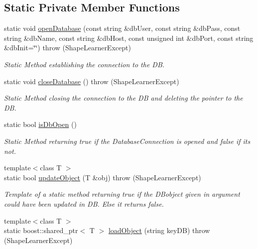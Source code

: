 \subsection*{Static Private Member Functions}
\begin{DoxyCompactItemize}
\item 
static void \hyperlink{class_database_manager_1_1_interface_a22da4aa92f1e0488a977f019e7829caf}{open\+Database} (const string \&db\+User, const string \&db\+Pass, const string \&db\+Name, const string \&db\+Host, const unsigned int \&db\+Port, const string \&db\+Init=\char`\"{}\char`\"{})  throw (\+Shape\+Learner\+Except)
\begin{DoxyCompactList}\small\item\em Static Method establishing the connection to the D\+B. \end{DoxyCompactList}\item 
static void \hyperlink{class_database_manager_1_1_interface_a5feb07e8ef1e5baf8159bc6ac4018582}{close\+Database} ()  throw (\+Shape\+Learner\+Except)
\begin{DoxyCompactList}\small\item\em Static Method closing the connection to the D\+B and deleting the pointer to the D\+B. \end{DoxyCompactList}\item 
static bool \hyperlink{class_database_manager_1_1_interface_aa33b3e66a60fc09a0eed24df4cad6227}{is\+Db\+Open} ()
\begin{DoxyCompactList}\small\item\em Static Method returning true if the Database\+Connection is opened and false if it\textquotesingle{}s not. \end{DoxyCompactList}\item 
{\footnotesize template$<$class T $>$ }\\static bool \hyperlink{class_database_manager_1_1_interface_a385369ee44ab05ad1670dcb6942a5200}{update\+Object} (T \&obj)  throw (\+Shape\+Learner\+Except)
\begin{DoxyCompactList}\small\item\em Template of a static method returning true if the D\+Bobject given in argument could have been updated in D\+B. Else it returns false. \end{DoxyCompactList}\item 
{\footnotesize template$<$class T $>$ }\\static boost\+::shared\+\_\+ptr$<$ T $>$ \hyperlink{class_database_manager_1_1_interface_a31e4e7e23b05ee344710ca67da57827f}{load\+Object} (string key\+D\+B)  throw (\+Shape\+Learner\+Except)

\end{DoxyCompactItemize}
